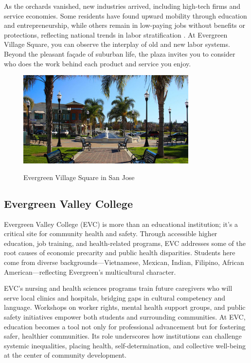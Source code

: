 \documentclass[12pt]{article}
\begin{document}
As the orchards vanished, new industries arrived, including high-tech firms and service economies. Some residents have found upward mobility through education and entrepreneurship, while others remain in low-paying jobs without benefits or protections, reflecting national trends in labor stratification \cite{cohen2011braceros}. At Evergreen Village Square, you can observe the interplay of old and new labor systems. Beyond the pleasant façade of suburban life, the plaza invites you to consider who does the work behind each product and service you enjoy.

\begin{figure}[h]
  \centering
  \includegraphics[width=0.8\textwidth]{assets/village_square.png}
  \caption{Evergreen Village Square in San Jose}
  \label{fig:village_square}
  \cite{thetahoeguyevergreen}
\end{figure}

\subsection{Evergreen Valley College}

Evergreen Valley College (EVC) is more than an educational institution; it’s a critical site for community health and safety. Through accessible higher education, job training, and health-related programs, EVC addresses some of the root causes of economic precarity and public health disparities. Students here come from diverse backgrounds—Vietnamese, Mexican, Indian, Filipino, African American—reflecting Evergreen’s multicultural character.

EVC’s nursing and health sciences programs train future caregivers who will serve local clinics and hospitals, bridging gaps in cultural competency and language. Workshops on worker rights, mental health support groups, and public safety initiatives empower both students and surrounding communities. At EVC, education becomes a tool not only for professional advancement but for fostering safer, healthier communities. Its role underscores how institutions can challenge systemic inequalities, placing health, self-determination, and collective well-being at the center of community development.
\end{document}
